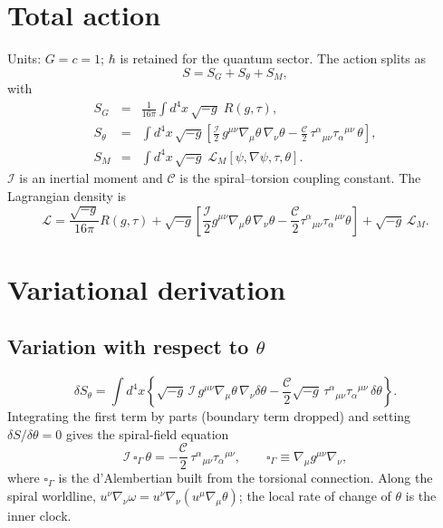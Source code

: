 \documentclass[11pt]{article}
\newcommand{\beq}{\begin{equation}}
\newcommand{\eeq}{\end{equation}}
\newcommand{\bea}{\begin{align}}
\newcommand{\eea}{\end{align}}
\newcommand{\I}{\mathcal{I}}
\newcommand{\C}{\mathcal{C}}
\begin{document}
\section{Total action}
\label{sec:action}
Units: $G=c=1$; $\hbar$ is retained for the quantum sector. The action splits as
\beq
S = S_G + S_\theta + S_M ,
\eeq
with
\bea
S_G &=& \frac{1}{16\pi}\int d^4x\,\sqrt{-g}\;R(g,\tau) ,\\
S_\theta &=& \int d^4x\,\sqrt{-g}\left[
  \frac{\I}{2}\,g^{\mu\nu}\nabla_\mu\theta\,\nabla_\nu\theta
  - \frac{\C}{2}\,\tau^\alpha{}_{\mu\nu}\tau_\alpha{}^{\mu\nu}\,\theta
\right],\\
S_M &=& \int d^4x\,\sqrt{-g}\;\mathcal{L}_M[\psi,\nabla\psi,\tau,\theta] .
\eea
$\I$ is an inertial moment and $\C$ is the spiral--torsion coupling constant.
The Lagrangian density is
\beq
\mathcal{L} = \frac{\sqrt{-g}}{16\pi}R(g,\tau)
+ \sqrt{-g}\left[
  \frac{\I}{2}g^{\mu\nu}\nabla_\mu\theta\,\nabla_\nu\theta
  - \frac{\C}{2}\tau^\alpha{}_{\mu\nu}\tau_\alpha{}^{\mu\nu}\theta
\right]
+ \sqrt{-g}\,\mathcal{L}_M .
\eeq

\section{Variational derivation}
\label{sec:var}

\subsection{Variation with respect to $\theta$}
\label{sec:theta}
\beq
\delta S_\theta = \int d^4x\left\{
  \sqrt{-g}\,\I\,g^{\mu\nu}\nabla_\mu\theta\,\nabla_\nu\delta\theta
  - \frac{\C}{2}\sqrt{-g}\,\tau^\alpha{}_{\mu\nu}\tau_\alpha{}^{\mu\nu}\,\delta\theta
\right\}.
\eeq
Integrating the first term by parts (boundary term dropped) and setting $\delta S/\delta\theta=0$
gives the spiral-field equation
\beq
\I\,\square_\Gamma\,\theta = -\frac{\C}{2}\,\tau^\alpha{}_{\mu\nu}\tau_\alpha{}^{\mu\nu},
\qquad
\square_\Gamma \equiv \nabla_\mu g^{\mu\nu}\nabla_\nu ,
\eeq
where $\square_\Gamma$ is the d'Alembertian built from the torsional connection. Along the
spiral worldline, $u^\nu\nabla_\nu\omega = u^\nu\nabla_\nu(u^\mu\nabla_\mu\theta)$; the local
rate of change of $\theta$ is the inner clock.
\end{document}
